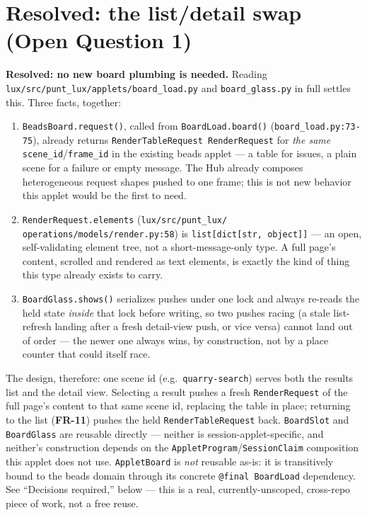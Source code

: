 \documentclass[a4paper,11pt]{report}
\newcommand{\fr}[1]{\textbf{FR-#1}}
\begin{document}
\section{Resolved: the list/detail swap (Open Question 1)}

\textbf{Resolved: no new board plumbing is needed.} Reading
\texttt{lux/src/punt\_lux/applets/board\_load.py} and
\texttt{board\_glass.py} in full settles this. Three facts, together:

\begin{enumerate}
  \item \texttt{BeadsBoard.request()}, called from
    \texttt{BoardLoad.board()} (\texttt{board\_load.py:73-75}), already
    returns \texttt{RenderTableRequest \textbar{} RenderRequest} for
    \emph{the same} \texttt{scene\_id}/\texttt{frame\_id} in the existing
    beads applet --- a table for issues, a plain scene for a failure or
    empty message. The Hub already composes heterogeneous request shapes
    pushed to one frame; this is not new behavior this applet would be
    the first to need.
  \item \texttt{RenderRequest.elements} (\texttt{lux/src/punt\_lux/}\allowbreak
    \texttt{operations/models/render.py:58}) is
    \texttt{list[dict[str, object]]} --- an open, self-validating element
    tree, not a short-message-only type. A full page's content, scrolled
    and rendered as text elements, is exactly the kind of thing this type
    already exists to carry.
  \item \texttt{BoardGlass.shows()} serializes pushes under one lock and
    always re-reads the held state \emph{inside} that lock before
    writing, so two pushes racing (a stale list-refresh landing after a
    fresh detail-view push, or vice versa) cannot land out of order --- the
    newer one always wins, by construction, not by a place counter that
    could itself race.
\end{enumerate}

The design, therefore: one scene id (e.g.\ \texttt{quarry-search}) serves
both the results list and the detail view. Selecting a result pushes a
fresh \texttt{RenderRequest} of the full page's content to that same
scene id, replacing the table in place; returning to the list (\fr{11})
pushes the held \texttt{RenderTableRequest} back. \texttt{BoardSlot} and
\texttt{BoardGlass} are reusable directly --- neither is
session-applet-specific, and neither's construction depends on the
\texttt{AppletProgram}/\texttt{SessionClaim} composition this applet does
not use. \texttt{AppletBoard} is \emph{not} reusable as-is: it is
transitively bound to the beads domain through its concrete
\texttt{@final BoardLoad} dependency. See ``Decisions required,'' below
--- this is a real, currently-unscoped, cross-repo piece of work, not a
free reuse.
\end{document}
